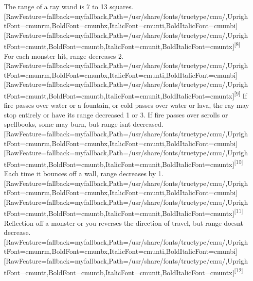 The range of a ray wand is 7 to 13 squares.\allowbreak{}\setmainfont{cmunrm.ttf}[RawFeature={fallback=myfallback},Path=/usr/share/fonts/truetype/cmu/,UprightFont=cmunrm,BoldFont=cmunbx,ItalicFont=cmunti,BoldItalicFont=cmunbi]\setmonofont{cmunrm.ttf}[RawFeature={fallback=myfallback},Path=/usr/share/fonts/truetype/cmu/,UprightFont=cmuntt,BoldFont=cmuntb,ItalicFont=cmunit,BoldItalicFont=cmuntx]\textsuperscript{{$\text{[}$}8{$\text{]}$}} For each monster hit, range decreases 2.\allowbreak{}\setmainfont{cmunrm.ttf}[RawFeature={fallback=myfallback},Path=/usr/share/fonts/truetype/cmu/,UprightFont=cmunrm,BoldFont=cmunbx,ItalicFont=cmunti,BoldItalicFont=cmunbi]\setmonofont{cmunrm.ttf}[RawFeature={fallback=myfallback},Path=/usr/share/fonts/truetype/cmu/,UprightFont=cmuntt,BoldFont=cmuntb,ItalicFont=cmunit,BoldItalicFont=cmuntx]\textsuperscript{{$\text{[}$}9{$\text{]}$}} If fire passes over water or a fountain, or cold passes over water or lava, the ray may stop entirely or have its range decreased 1 or 3. If fire passes over scrolls or spellbooks, some may burn, but range isn\textquotesingle{}t decreased.\allowbreak{}\setmainfont{cmunrm.ttf}[RawFeature={fallback=myfallback},Path=/usr/share/fonts/truetype/cmu/,UprightFont=cmunrm,BoldFont=cmunbx,ItalicFont=cmunti,BoldItalicFont=cmunbi]\setmonofont{cmunrm.ttf}[RawFeature={fallback=myfallback},Path=/usr/share/fonts/truetype/cmu/,UprightFont=cmuntt,BoldFont=cmuntb,ItalicFont=cmunit,BoldItalicFont=cmuntx]\textsuperscript{{$\text{[}$}10{$\text{]}$}} Each time it bounces off a wall, range decreases by 1.\allowbreak{}\setmainfont{cmunrm.ttf}[RawFeature={fallback=myfallback},Path=/usr/share/fonts/truetype/cmu/,UprightFont=cmunrm,BoldFont=cmunbx,ItalicFont=cmunti,BoldItalicFont=cmunbi]\setmonofont{cmunrm.ttf}[RawFeature={fallback=myfallback},Path=/usr/share/fonts/truetype/cmu/,UprightFont=cmuntt,BoldFont=cmuntb,ItalicFont=cmunit,BoldItalicFont=cmuntx]\textsuperscript{{$\text{[}$}11{$\text{]}$}} Reflection off a monster or you reverses the direction of travel, but range doesn\textquotesingle{}t decrease.\allowbreak{}\setmainfont{cmunrm.ttf}[RawFeature={fallback=myfallback},Path=/usr/share/fonts/truetype/cmu/,UprightFont=cmunrm,BoldFont=cmunbx,ItalicFont=cmunti,BoldItalicFont=cmunbi]\setmonofont{cmunrm.ttf}[RawFeature={fallback=myfallback},Path=/usr/share/fonts/truetype/cmu/,UprightFont=cmuntt,BoldFont=cmuntb,ItalicFont=cmunit,BoldItalicFont=cmuntx]\textsuperscript{{$\text{[}$}12{$\text{]}$}}



